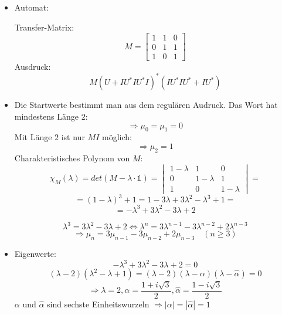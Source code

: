 \begin{itemize}
  \item Automat:


    Transfer-Matrix:
    \[ M = \begin{bmatrix} 1 & 1 & 0 \\ 0 & 1 & 1 \\ 1 & 0 & 1 \end{bmatrix} \]
    Ausdruck:
    \[ M(U+IU^{*}IU^{*}I)^{*}(IU^{*}IU^{*}+IU^{*}) \]

  \item Die Startwerte bestimmt man aus dem regulären Audruck. Das Wort hat
    mindestens Länge $2$:
    \[ \Rightarrow \mu_{0} = \mu_{1} = 0 \]
    Mit Länge $2$ ist nur $MI$ möglich:
    \[ \Rightarrow \mu_{2} = 1 \]
    Charakteristisches Polynom von $M$:
    \[ \chi_{M}(\lambda) = det(M - \lambda \cdot \mathds{1})
       = \begin{vmatrix} 1-\lambda & 1 & 0 \\ 
                         0 & 1-\lambda & 1 \\ 
                         1 & 0 & 1-\lambda \end{vmatrix} = \]
    \[ = (1 - \lambda)^3 + 1 = 1 - 3\lambda + 3\lambda^2 - \lambda^3 + 1 = \]
    \[ = -\lambda^{3} + 3\lambda^{2} - 3\lambda + 2 \]

    \[ \lambda^{3} = 3\lambda^{2} - 3\lambda + 2 \Leftrightarrow \lambda^{n}
       = 3\lambda^{n-1} - 3\lambda^{n-2} + 2\lambda^{n-3} \]
    \[ \Rightarrow \mu_{n} = 3\mu_{n-1} - 3\mu_{n-2} + 2\mu_{n-3}
       \quad (n \geq 3) \]

  \item Eigenwerte:
    \[ -\lambda^{3} + 3\lambda^{2} - 3\lambda + 2 = 0\]
    \[ (\lambda - 2) (\lambda^{2} - \lambda + 1) 
       = (\lambda - 2) (\lambda - \alpha) (\lambda - \hat \alpha) = 0\]
    \[ \Rightarrow \lambda = 2, 
       \alpha = \frac{1+i\sqrt{3}}{2}, 
       \hat \alpha = \frac{1-i\sqrt{3}}{2} \]
    $\alpha$ und $\hat \alpha$ sind sechste Einheitswurzeln $\Rightarrow
    |\alpha| = |\hat \alpha| = 1$


\end{itemize}
